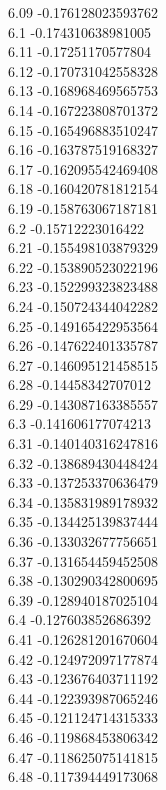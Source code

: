 {6.09	-0.176128023593762\\
6.1	-0.174310638981005\\
6.11	-0.17251170577804\\
6.12	-0.170731042558328\\
6.13	-0.168968469565753\\
6.14	-0.167223808701372\\
6.15	-0.165496883510247\\
6.16	-0.163787519168327\\
6.17	-0.162095542469408\\
6.18	-0.160420781812154\\
6.19	-0.158763067187181\\
6.2	-0.15712223016422\\
6.21	-0.155498103879329\\
6.22	-0.153890523022196\\
6.23	-0.152299323823488\\
6.24	-0.150724344042282\\
6.25	-0.149165422953564\\
6.26	-0.147622401335787\\
6.27	-0.146095121458515\\
6.28	-0.14458342707012\\
6.29	-0.143087163385557\\
6.3	-0.141606177074213\\
6.31	-0.140140316247816\\
6.32	-0.138689430448424\\
6.33	-0.137253370636479\\
6.34	-0.135831989178932\\
6.35	-0.134425139837444\\
6.36	-0.133032677756651\\
6.37	-0.131654459452508\\
6.38	-0.130290342800695\\
6.39	-0.128940187025104\\
6.4	-0.127603852686392\\
6.41	-0.126281201670604\\
6.42	-0.124972097177874\\
6.43	-0.123676403711192\\
6.44	-0.122393987065246\\
6.45	-0.121124714315333\\
6.46	-0.119868453806342\\
6.47	-0.118625075141815\\
6.48	-0.117394449173068\\
}
